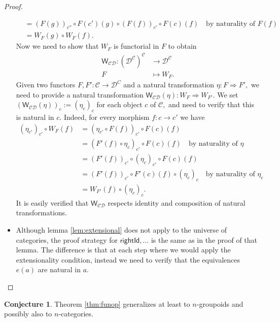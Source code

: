 \documentclass[a4paper]{article}
\theoremstyle{definition}
\newtheorem{conjecture}[definition]{Conjecture}
\theoremstyle{remark}
\newcommand{\C}{\mathcal{C}}
\newcommand{\D}{\mathcal{D}}
\newcommand{\nm}{\mathsf}
\newcommand{\combinator}{\nm}
\newcommand{\dupFun}{\combinator{W}}
\begin{document}
\begin{proof}
\begin{itemize}
\begin{align*}
                     &= (F(g))_{c''} \circ F(c')(g) \circ (F(f))_{c'} \circ F(c)(f) \quad \text{by naturality of $F(f)$}\\
                     &= W_F(g) \circ W_F(f).
    \end{align*}
    Now we need to show that $W_F$ is functorial in $F$ to obtain
    \begin{align*}
      \dupFun_{\C\D} : (\D^\C)^\C &\to     \D^\C\\
                       F          &\mapsto W_F.
    \end{align*}
    Given two functors $F,F' : \C \to \D^C$ and a natural transformation
    $\eta : F \Rightarrow F',$ we need to provide a natural transformation
    $\dupFun_{\C\D}(\eta) : W_F \Rightarrow W_{F'}.$ We set
    $(\dupFun_{\C\D}(\eta))_c := (\eta_c)_c$ for each object $c$ of $\C,$
    and need to verify that this is natural in $c.$ Indeed, for every
    morphism $f : c \to c'$ we have
    \begin{align*}
      (\eta_{c'})_{c'} \circ W_F(f) &= (\eta_{c'} \circ F(f))_{c'} \circ F(c)(f)\\
                                    &= (F'(f) \circ \eta_c)_{c'} \circ F(c)(f) \quad \text{by naturality of $\eta$}\\
                                    &= (F'(f))_{c'} \circ (\eta_c)_{c'} \circ F(c)(f)\\
                                    &= (F'(f))_{c'} \circ F'(c)(f) \circ (\eta_c)_c \quad \text{by naturality of $\eta_c$}\\
                                    &= W_{F'}(f) \circ (\eta_c)_c.
    \end{align*}
    It is easily verified that $\dupFun_{\C\D}$ respects identity and
    composition of natural transformations.
    \item Although lemma \ref{lem:extensional} does not apply to the universe of
    categories, the proof strategy for $\nm{rightId},\ldots$ is the same
    as in the proof of that lemma. The difference is that at each step where we
    would apply the extensionality condition, instead we need to verify that the
    equivalences $e(a)$ are natural in $a.$ \qedhere
  \end{itemize}
\end{proof}

\begin{conjecture}
  Theorem \ref{thm:funop} generalizes at least to $n$-groupoids and possibly
  also to $n$-categories.
\end{conjecture}
\end{document}
